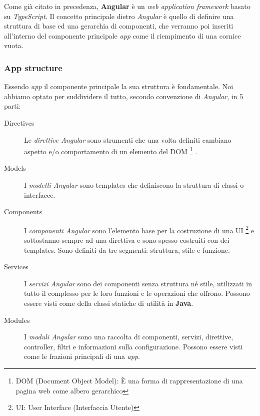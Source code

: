 \documentclass[twoside]{supsistudent}
\begin{document}
Come già citato in precedenza, \textbf{Angular} è un \textit{web application
framework} basato su \textit{TypeScript}. Il concetto principale dietro 
\textit{Angular} è quello di definire una struttura di base ed una gerarchia
di componenti, che verranno poi inseriti all'interno del componente principale
\textit{app} come il riempimento di una cornice vuota.

\subsubsection{App structure}

Essendo \textit{app} il componente principale la sua struttura è fondamentale.
Noi abbiamo optato per suddividere il tutto, secondo convenzione di 
\textit{Angular}, in 5 parti:

\begin{description}

  \item[Directives] Le \textit{direttive Angular} sono strumenti che una volta
  definiti cambiano aspetto e/o comportamento di un elemento del DOM
  \footnote{DOM (Document Object Model): È una forma di rappresentazione di
  una pagina web come albero gerarchico}
  . 

  \item[Models] I \textit{modelli Angular} sono templates che definiscono la
  struttura di classi o interfacce.

  \item[Components] I \textit{componenti Angular} sono l'elemento base per la
  costruzione di una UI
  \footnote{UI: User Interface (Interfaccia Utente)}
  e sottostanno sempre ad una direttiva e sono spesso costruiti con dei 
  templates. Sono definiti da tre segmenti: struttura, stile e funzione.  

  \item[Services] I \textit{servizi Angular} sono dei componenti senza 
  struttura né stile, utilizzati in tutto il complesso per le loro funzioni
  e le operazioni che offrono. Possono essere visti come della classi statiche
  di utilità in \textbf{Java}.

  \item[Modules] I \textit{moduli Angular} sono una raccolta di componenti, 
  servizi, direttive, controller, filtri e informazioni sulla configurazione.
  Possono essere visti come le frazioni principali di una \textit{app}.

\end{description}
\end{document}
